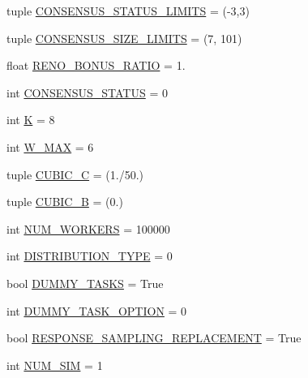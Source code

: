 \begin{DoxyCompactItemize}
\item 
tuple \hyperlink{namespacedynamicfilterapp_1_1toggles_a36cac18f3d673a6f2cd86c88127e41b9}{C\+O\+N\+S\+E\+N\+S\+U\+S\+\_\+\+S\+T\+A\+T\+U\+S\+\_\+\+L\+I\+M\+I\+TS} = (-\/3,3)
\item 
tuple \hyperlink{namespacedynamicfilterapp_1_1toggles_a1a20e4a8af9569eaef5eb5b23f07222b}{C\+O\+N\+S\+E\+N\+S\+U\+S\+\_\+\+S\+I\+Z\+E\+\_\+\+L\+I\+M\+I\+TS} = (7, 101)
\item 
float \hyperlink{namespacedynamicfilterapp_1_1toggles_a18fd240c30a7c4a6ee9df12436a744ab}{R\+E\+N\+O\+\_\+\+B\+O\+N\+U\+S\+\_\+\+R\+A\+T\+IO} = 1.
\item 
int \hyperlink{namespacedynamicfilterapp_1_1toggles_a090eab76b7b0e234f422b87e30adf793}{C\+O\+N\+S\+E\+N\+S\+U\+S\+\_\+\+S\+T\+A\+T\+US} = 0
\item 
int \hyperlink{namespacedynamicfilterapp_1_1toggles_a2689c4b3931025b79053532a5f1b0a85}{K} = 8
\item 
int \hyperlink{namespacedynamicfilterapp_1_1toggles_add63171ca968cbd5ca4d60dfbf9a2746}{W\+\_\+\+M\+AX} = 6
\item 
tuple \hyperlink{namespacedynamicfilterapp_1_1toggles_a073a7aa1bc6b8c92d5682922759765fd}{C\+U\+B\+I\+C\+\_\+C} = (1./50.)
\item 
tuple \hyperlink{namespacedynamicfilterapp_1_1toggles_a2d4f2e30d34616c754114da7b5c88000}{C\+U\+B\+I\+C\+\_\+B} = (0.)
\item 
int \hyperlink{namespacedynamicfilterapp_1_1toggles_a806fc12166c09fa5baabfcbe218040ae}{N\+U\+M\+\_\+\+W\+O\+R\+K\+E\+RS} = 100000
\item 
int \hyperlink{namespacedynamicfilterapp_1_1toggles_aceed21fa0675802d2f756c7da43cb049}{D\+I\+S\+T\+R\+I\+B\+U\+T\+I\+O\+N\+\_\+\+T\+Y\+PE} = 0
\item 
bool \hyperlink{namespacedynamicfilterapp_1_1toggles_a16edb4f07d82f0494347a0977663e6f4}{D\+U\+M\+M\+Y\+\_\+\+T\+A\+S\+KS} = True
\item 
int \hyperlink{namespacedynamicfilterapp_1_1toggles_a0b87eab5c4f4f0b986a43805f825d2c6}{D\+U\+M\+M\+Y\+\_\+\+T\+A\+S\+K\+\_\+\+O\+P\+T\+I\+ON} = 0
\item 
bool \hyperlink{namespacedynamicfilterapp_1_1toggles_a1f569cdee80dfd4d7a2d7a3f3aebc47f}{R\+E\+S\+P\+O\+N\+S\+E\+\_\+\+S\+A\+M\+P\+L\+I\+N\+G\+\_\+\+R\+E\+P\+L\+A\+C\+E\+M\+E\+NT} = True
\item 
int \hyperlink{namespacedynamicfilterapp_1_1toggles_a3baf5565851cd87736238d8dddfc1106}{N\+U\+M\+\_\+\+S\+IM} = 1
\item 

\end{DoxyCompactItemize}
